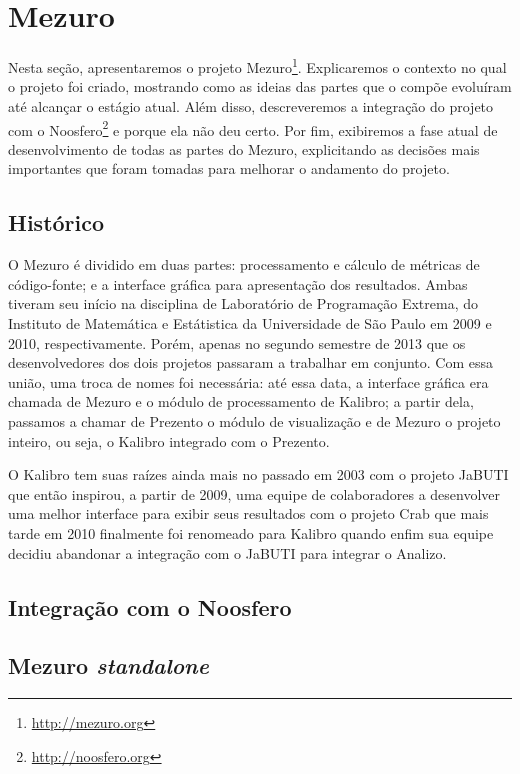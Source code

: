\documentclass{llncs}
\begin{document}
\section{Mezuro}\label{sec:mezuro}
Nesta seção, apresentaremos o projeto Mezuro\footnote{\url{http://mezuro.org}}. Explicaremos o contexto no qual o projeto foi criado, mostrando como as ideias das partes que o compõe evoluíram até alcançar o estágio atual. Além disso, descreveremos a integração do projeto com o Noosfero\footnote{\url{http://noosfero.org}} e porque ela não deu certo. Por fim, exibiremos a fase atual de desenvolvimento de todas as partes do Mezuro, explicitando as decisões mais importantes que foram tomadas para melhorar o andamento do projeto.

\subsection{Histórico}\label{sec:historico}
O Mezuro é dividido em duas partes: processamento e cálculo de métricas de código-fonte; e a interface gráfica para apresentação dos resultados. Ambas tiveram seu início na disciplina de Laboratório de Programação Extrema, do Instituto de Matemática e Estátistica da Universidade de São Paulo em 2009 e 2010, respectivamente. Porém, apenas no segundo semestre de 2013 que os desenvolvedores dos dois projetos passaram a trabalhar em conjunto. Com essa união, uma troca de nomes foi necessária: até essa data, a interface gráfica era chamada de Mezuro e o módulo de processamento de Kalibro; a partir dela, passamos a chamar de Prezento o módulo de visualização e de Mezuro o projeto inteiro, ou seja, o Kalibro integrado com o Prezento.

O Kalibro\cite{de2013kalibro} tem suas raízes ainda mais no passado em 2003 com o projeto JaBUTI\cite{vincenzi2003jabuti} que então inspirou, a partir de 2009, uma equipe de colaboradores a desenvolver uma melhor interface para exibir seus resultados com o projeto Crab\cite{meirelles2009crab} que mais tarde em 2010 finalmente foi renomeado para Kalibro quando enfim sua equipe decidiu abandonar a integração com o JaBUTI para integrar o Analizo\cite{terceiro2010analizo}.

\subsection{Integração com o Noosfero}\label{sec:noosfero}

\subsection{Mezuro \textit{standalone}}\label{sec:standalone}
\end{document}
